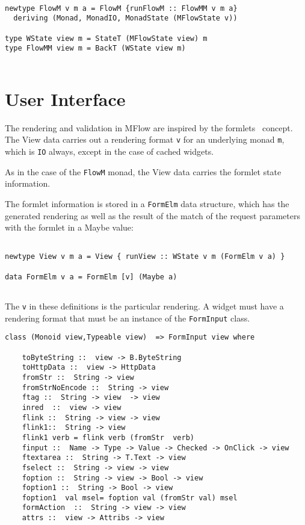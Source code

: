 \documentclass{tmr}
\begin{document}
{\tt 
 
\begin{verbatim} 
 
newtype FlowM v m a = FlowM {runFlowM :: FlowMM v m a} 
  deriving (Monad, MonadIO, MonadState (MFlowState v)) 
 
type WState view m = StateT (MFlowState view) m 
type FlowMM view m = BackT (WState view m) 
 
\end{verbatim} 
 
} 
 
\section{User Interface} 
The rendering and validation in MFlow are inspired by the  formlets~\cite{auth:formlets} concept. The View  data carries out a rendering format {\tt v} for an underlying monad {\tt m}, which is {\tt IO} always, except in the case of cached widgets.
 
As in the case of the {\tt FlowM} monad, the View data carries the formlet state information. 
 
The formlet information is stored in a {\tt FormElm} data structure, which has the generated rendering as well as the result of the match of the request parameters with the formlet   in a Maybe value: 
{\tt 
 
\begin{verbatim} 
 
newtype View v m a = View { runView :: WState v m (FormElm v a) } 
 
data FormElm v a = FormElm [v] (Maybe a) 
 
\end{verbatim} 
 
} 
The {\tt v} in these definitions is the particular rendering.  A widget must have a rendering format that must be an instance of the {\tt FormInput} class. 
 
{\tt 
 
\begin{verbatim} 
class (Monoid view,Typeable view)  => FormInput view where 
 
    toByteString ::  view -> B.ByteString 
    toHttpData ::  view -> HttpData 
    fromStr ::  String -> view 
    fromStrNoEncode ::  String -> view 
    ftag ::  String -> view  -> view 
    inred  ::  view -> view 
    flink ::  String -> view -> view 
    flink1::  String -> view 
    flink1 verb = flink verb (fromStr  verb) 
    finput ::  Name -> Type -> Value -> Checked -> OnClick -> view 
    ftextarea ::  String -> T.Text -> view 
    fselect ::  String -> view -> view 
    foption ::  String -> view -> Bool -> view 
    foption1 ::  String -> Bool -> view 
    foption1  val msel= foption val (fromStr val) msel 
    formAction  ::  String -> view -> view 
    attrs ::  view -> Attribs -> view 
 
 
\end{verbatim} 
 
} 
 
\end{document}
